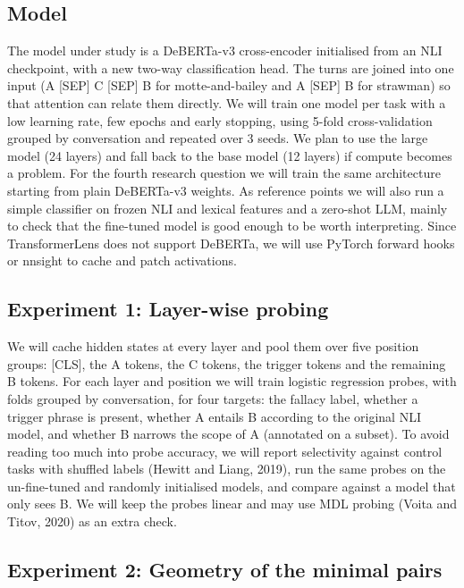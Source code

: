 \documentclass[11pt,a4paper]{article}
\begin{document}
\subsection{Model}

The model under study is a DeBERTa-v3 cross-encoder initialised from an NLI checkpoint, with a new two-way classification head. The turns are joined into one input (A [SEP] C [SEP] B for motte-and-bailey and A [SEP] B for strawman) so that attention can relate them directly. We will train one model per task with a low learning rate, few epochs and early stopping, using 5-fold cross-validation grouped by conversation and repeated over 3 seeds. We plan to use the large model (24 layers) and fall back to the base model (12 layers) if compute becomes a problem. For the fourth research question we will train the same architecture starting from plain DeBERTa-v3 weights. As reference points we will also run a simple classifier on frozen NLI and lexical features and a zero-shot LLM, mainly to check that the fine-tuned model is good enough to be worth interpreting. Since TransformerLens does not support DeBERTa, we will use PyTorch forward hooks or nnsight to cache and patch activations.

\subsection{Experiment 1: Layer-wise probing}

We will cache hidden states at every layer and pool them over five position groups: [CLS], the A tokens, the C tokens, the trigger tokens and the remaining B tokens. For each layer and position we will train logistic regression probes, with folds grouped by conversation, for four targets: the fallacy label, whether a trigger phrase is present, whether A entails B according to the original NLI model, and whether B narrows the scope of A (annotated on a subset). To avoid reading too much into probe accuracy, we will report selectivity against control tasks with shuffled labels (Hewitt and Liang, 2019), run the same probes on the un-fine-tuned and randomly initialised models, and compare against a model that only sees B. We will keep the probes linear and may use MDL probing (Voita and Titov, 2020) as an extra check.

\subsection{Experiment 2: Geometry of the minimal pairs}
\end{document}
